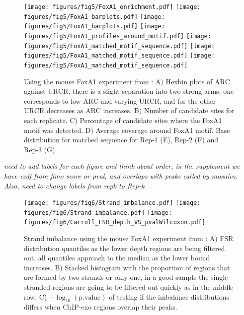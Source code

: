 \documentclass{bmcart}
\begin{document}
\newpage

\begin{figure}[h!]
  \centering
  \texttt{[image: figures/fig5/FoxA1\_enrichment.pdf]}
  \newline
  \texttt{[image: figures/fig5/FoxA1\_barplots.pdf]}
  \texttt{[image: figures/fig5/FoxA1\_barplots.pdf]}
  \texttt{[image: figures/fig5/FoxA1\_profiles\_around\_motif.pdf]}
  \texttt{[image: figures/fig5/FoxA1\_matched\_motif\_sequence.pdf]}
  \texttt{[image: figures/fig5/FoxA1\_matched\_motif\_sequence.pdf]}
  \texttt{[image: figures/fig5/FoxA1\_matched\_motif\_sequence.pdf]}
  \caption{Using the mouse FoxA1 experiment from \cite{exoillumina}:
    A) Hexbin plots of $\mbox{ARC}$ against $\mbox{URCR}$, there is a
    slight separation into two strong arms, one corresponds to low
    $\mbox{ARC}$ and varying $\mbox{URCR}$, and for the other
    $\mbox{URCR}$ decreases as $\mbox{ARC}$ increases. B) Number of
    candidate sites for each replicate. C) Percentage of candidate
    sites where the FoxA1 motif was detected. D) Average coverage
    around FoxA1 motif. Base distribution for matched sequence for
    Rep-1 (E), Rep-2 (F) and Rep-3 (G).}
  \label{fig:enrich}
\end{figure}

{\color{red} \emph{need to add labels for each figure and think about
    order, in the supplement we have ecdf from fimo score or pval, and
    overlaps with peaks called by mosaics.
\newline
Also, need to change labels from repk to Rep-k
}}

\newpage

\begin{figure}[h!]
  \centering  
  \texttt{[image: figures/fig6/Strand\_imbalance.pdf]} 
  \newline
  \texttt{[image: figures/fig6/Strand\_imbalance.pdf]} 
  \texttt{[image: figures/fig6/Carroll\_FSR\_depth\_VS\_pvalWilcoxon.pdf]}
  \caption{Strand imbalance using the mouse FoxA1 experiment from
    \cite{exoillumina}: A) FSR distribution quantiles as the lower
    depth regions are being filtered out, all quantiles approach to
    the median as the lower bound increases. B) Stacked histogram with
    the proportion of regions that are formed by two strands or only
    one, in a good sample the single-stranded regions are going to be
    filtered out quickly as in the middle row. C)
    $-\log_{10}(\text{p.value})$ of testing if the imbalance
    distributions differs when ChIP-exo regions overlap their peaks.}
  \label{fig:strand}
\end{figure}
\end{document}
